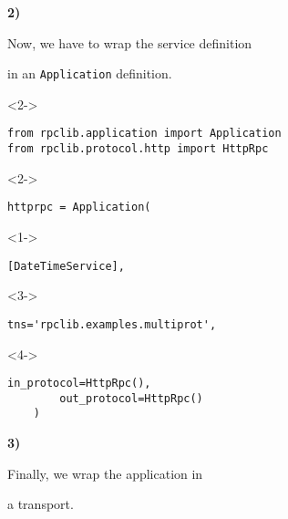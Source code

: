\documentclass{beamer}
\begin{document}
\begin{frame}
  \LARGE

  \color{red} \textbf{2)} \color{black}

  \begin{center}
    Now, we have to wrap the service definition

    \bigskip

    in an \texttt{Application} definition.

  \end{center}

\end{frame}

\begin{frame}[fragile]
\begin{uncoverenv}<2->
  \vspace{-13pt}
  \begin{lstlisting}[frame=none]
from rpclib.application import Application
from rpclib.protocol.http import HttpRpc
  \end{lstlisting}
\end{uncoverenv}
\begin{uncoverenv}<2->
  \begin{lstlisting}[frame=none]
httprpc = Application(
  \end{lstlisting}
\end{uncoverenv}
\begin{uncoverenv}<1->
  \vspace{-13pt}
  \begin{lstlisting}[frame=none]
        [DateTimeService],
  \end{lstlisting}
\end{uncoverenv}
\begin{uncoverenv}<3->
  \vspace{-13pt}
  \begin{lstlisting}[frame=none]
        tns='rpclib.examples.multiprot',
  \end{lstlisting}
\end{uncoverenv}
\begin{uncoverenv}<4->
  \vspace{-13pt}
  \begin{lstlisting}[frame=none]
        in_protocol=HttpRpc(),
        out_protocol=HttpRpc()
    )
  \end{lstlisting}
\end{uncoverenv}
\end{frame}

\begin{frame}
  \LARGE
  \color{red} \textbf{3)} \color{black}

  \begin{center}
    Finally, we wrap the application in

    \bigskip

    a transport.

  \end{center}

\end{frame}
\end{document}
